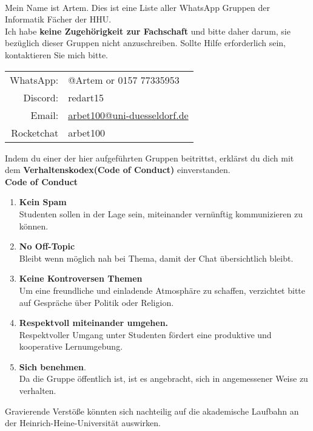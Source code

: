 \documentclass[a4paper,11pt]{article}
\newcommand{\header}[1]{%
    \fancyhead{}%
    \fancyhead[C]{\colorbox{headercolor}{\parbox{\dimexpr\textwidth-2\fboxsep}{\centering\textbf{WhatsApp Kontakte}}}}%
}
\newcommand{\fooder}[1]{
    \fancyfoot{}%
    \fancyfoot[C]{\colorbox{headercolor}{%
        \parbox{\dimexpr\textwidth-2\fboxsep}{%
            \centering%
            Infos
            }%
        }%
    }%
}%
\newcommand{\sectionstarInto}[1]{%
  \vspace{3cm}
  \section*{#1}
  \header{#1} %
  \phantomsection
  \addcontentsline{toc}{section}{#1}
  \fooder{#1}
}
\begin{document}
\let\oldclearpage\clearpage

\renewcommand{\clearpage}{}

\newpage
\noindent{}\\
Mein Name ist Artem. Dies ist eine Liste aller WhatsApp Gruppen der Informatik Fächer der HHU.\\
\noindent Ich habe \textbf{keine Zugehörigkeit zur Fachschaft} und bitte daher darum, sie bezüglich dieser Gruppen nicht anzuschreiben. Sollte Hilfe erforderlich sein, kontaktieren Sie mich bitte.

\begin{center}
\begin{tabular}{rl}
     WhatsApp: & @Artem or 0157 77335953\\
     Discord: & redart15\\
     Email: & \href{mailto:arbet100@uni-duesseldorf.de}{arbet100@uni-duesseldorf.de}\\
     Rocketchat & arbet100\\
\end{tabular}
\end{center}

\noindent Indem du einer der hier aufgeführten Gruppen beitrittst, erklärst du dich mit dem \textbf{Verhaltenskodex(Code of Conduct)} einverstanden.
\\
\large{\textbf{Code of Conduct}}
\begin{enumerate}
    \item \textbf{Kein Spam}\\
    Studenten sollen in der Lage sein, miteinander vernünftig kommunizieren zu können.
    \item \textbf{No Off-Topic}\\
    Bleibt wenn möglich nah bei Thema, damit der Chat übersichtlich bleibt.
    \item \textbf{Keine Kontroversen Themen}\\
    Um eine freundliche und einladende Atmosphäre zu schaffen, verzichtet bitte auf Gespräche über Politik oder Religion.
    \item \textbf{Respektvoll miteinander umgehen.}\\
    Respektvoller Umgang unter Studenten fördert eine produktive und kooperative Lernumgebung.
    \item \textbf{Sich benehmen}.\\
    Da die Gruppe öffentlich ist, ist es angebracht, sich in angemessener Weise zu verhalten.
\end{enumerate}
Gravierende Verstöße könnten sich nachteilig auf die akademische Laufbahn an der Heinrich-Heine-Universität auswirken.
\end{document}
